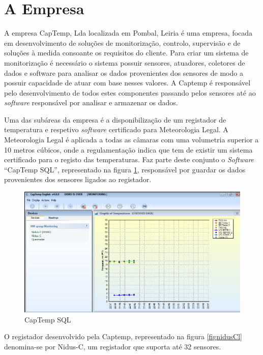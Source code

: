 \section{A Empresa}
\par
A empresa CapTemp, Lda localizada em Pombal, Leiria é uma empresa, focada em desenvolvimento de soluções de monitorização, controlo, supervisão e de soluções à medida consoante os requisitos do cliente. Para criar um sistema de monitorização é necessário o sistema possuir sensores, atuadores, coletores de dados e software para analisar os dados provenientes dos sensores de modo a possuir capacidade de atuar com base nesses valores. A Captemp é responsável pelo desenvolvimento de todos estes componentes passando pelos sensores até ao \textit{software} responsável por analisar e armazenar os dados.\par
Uma das subáreas da empresa é a disponibilização de um registador de temperatura e respetivo \textit{software} certificado para Meteorologia Legal. A Meteorologia Legal é aplicada a todas as câmaras com uma volumetria superior a 10 metros cúbicos, onde a regulamentação indica que tem de existir um sistema certificado para o registo das temperaturas.
Faz parte deste conjunto o \textit{Software} “CapTemp SQL”, representado na figura \ref{figcaptempsql}, responsável por guardar os dados provenientes dos sensores ligados ao registador.\par
\begin{figure}[ht]
  \centering
  \includegraphics[width=1.00\textwidth]{images/captemp.png}
  \caption{CapTemp SQL}\label{figcaptempsql}
\end{figure}
O registador desenvolvido pela Captemp, representado na figura \ref{fignidusCl} denomina-se por Nidus-C, um registador que suporta até 32 sensores.\par

